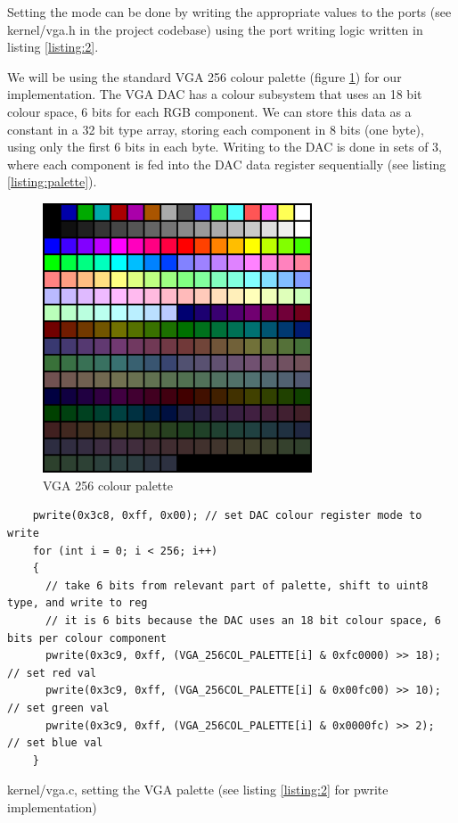 Setting the mode can be done by writing the appropriate values to the ports (see kernel/vga.h in the project codebase)
using the port writing logic written in listing \ref{listing:2}.

We will be using the standard VGA 256 colour palette (figure \ref{figure:vgacolor}) for
our implementation. The VGA DAC has a colour subsystem that uses an 18 bit colour
space, 6 bits for each RGB component. We can store this data as a constant in a 32 bit
type array, storing each component in 8 bits (one byte), using only the first 6 bits in each byte.
Writing to the DAC is done in sets of 3, where each component is fed into the DAC data register
sequentially (see listing \ref{listing:palette}).

\begin{figure}
    \centering
    \includegraphics[width=8cm]{1024px-VGA_palette_with_black_borders.png}
    \caption{VGA 256 colour palette}
    \label{figure:vgacolor}
\end{figure}
\begin{listing}
    \begin{verbatim}
    pwrite(0x3c8, 0xff, 0x00); // set DAC colour register mode to write
    for (int i = 0; i < 256; i++)
    {
      // take 6 bits from relevant part of palette, shift to uint8 type, and write to reg
      // it is 6 bits because the DAC uses an 18 bit colour space, 6 bits per colour component
      pwrite(0x3c9, 0xff, (VGA_256COL_PALETTE[i] & 0xfc0000) >> 18); // set red val
      pwrite(0x3c9, 0xff, (VGA_256COL_PALETTE[i] & 0x00fc00) >> 10); // set green val
      pwrite(0x3c9, 0xff, (VGA_256COL_PALETTE[i] & 0x0000fc) >> 2);  // set blue val
    }
    \end{verbatim}
    \caption{kernel/vga.c, setting the VGA palette (see listing \ref{listing:2} for pwrite implementation)}
    \label{listing:palette}
\end{listing}


